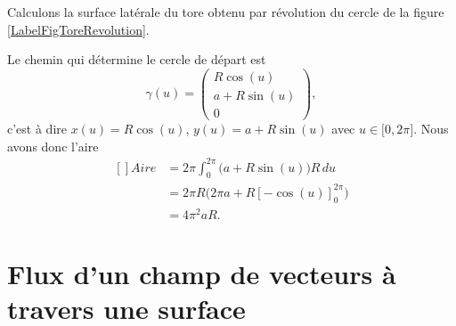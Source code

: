 \begin{example}
    Calculons la surface latérale du tore obtenu par révolution du cercle de la figure \ref{LabelFigToreRevolution}.                                                                                           
    \newcommand{\CaptionFigToreRevolution}{Si nous tournons ce cercle autour de l'axe $X$, nous obtenons un tore de rayon «externe» $a$ et de rayon «interne» $R$.}
    

    Le chemin qui détermine le cercle de départ est
    \begin{equation}
        \gamma(u)=\begin{pmatrix}
            R\cos(u)    \\ 
            a+R\sin(u)    \\ 
            0    
        \end{pmatrix},
    \end{equation}
    c'est à dire $x(u)=R\cos(u)$, $y(u)=a+R\sin(u)$ avec $u\in\mathopen[ 0 , 2\pi \mathclose]$. Nous avons donc l'aire
    \begin{equation}
        \begin{aligned}[]
            Aire&=2\pi\int_0^{2\pi}\big( a+R\sin(u) \big)R\,du\\
            &=2\pi R\big( 2\pi a+R[-\cos(u)]_0^{2\pi} \big)\\
            &=4\pi^2aR.
        \end{aligned}
    \end{equation}
\end{example}

\section{Flux d'un champ de vecteurs à travers une surface}

